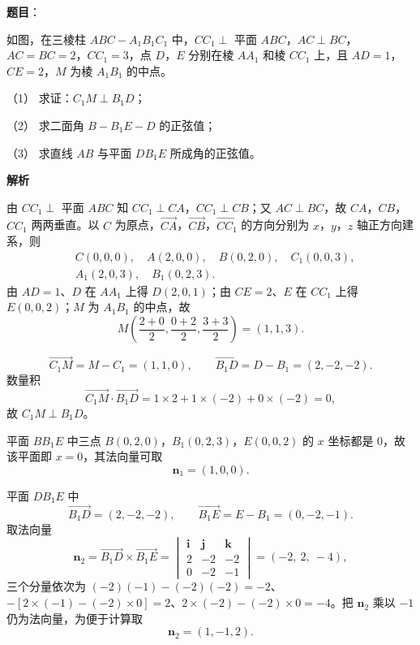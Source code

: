 \begin{answer}

\textbf{题目}：

如图，在三棱柱 $ABC-A_1B_1C_1$ 中，$CC_1\perp$ 平面 $ABC$，$AC\perp BC$，$AC=BC=2$，$CC_1=3$，点 $D$，$E$ 分别在棱 $AA_1$ 和棱 $CC_1$ 上，且 $AD=1$，$CE=2$，$M$ 为棱 $A_1B_1$ 的中点。

（1） 求证：$C_1M\perp B_1D$；

（2） 求二面角 $B-B_1E-D$ 的正弦值；

（3） 求直线 $AB$ 与平面 $DB_1E$ 所成角的正弦值。
\nopagebreak[4]
\begin{center}\end{center}
\nopagebreak[4]
\textbf{解析}

由 $CC_1\perp$ 平面 $ABC$ 知 $CC_1\perp CA$，$CC_1\perp CB$；又 $AC\perp BC$，故 $CA$，$CB$，$CC_1$ 两两垂直。以 $C$ 为原点，$\overrightarrow{CA}$，$\overrightarrow{CB}$，$\overrightarrow{CC_1}$ 的方向分别为 $x$，$y$，$z$ 轴正方向建系，则
\nopagebreak[4]
\[\begin{aligned}
&C(0,0,0),\quad A(2,0,0),\quad B(0,2,0),\quad C_1(0,0,3),\\
&A_1(2,0,3),\quad B_1(0,2,3).
\end{aligned}\]
由 $AD=1$、$D$ 在 $AA_1$ 上得 $D(2,0,1)$；由 $CE=2$、$E$ 在 $CC_1$ 上得 $E(0,0,2)$；$M$ 为 $A_1B_1$ 的中点，故
\nopagebreak[4]
\[M\left(\frac{2+0}2,\frac{0+2}2,\frac{3+3}2\right)=(1,1,3).\]


\nopagebreak[4]
\[\overrightarrow{C_1M}=M-C_1=(1,1,0),\qquad \overrightarrow{B_1D}=D-B_1=(2,-2,-2).\]
数量积
\nopagebreak[4]
\[\overrightarrow{C_1M}\cdot\overrightarrow{B_1D}=1\times2+1\times(-2)+0\times(-2)=0,\]
故 $C_1M\perp B_1D$。


平面 $BB_1E$ 中三点 $B(0,2,0)$，$B_1(0,2,3)$，$E(0,0,2)$ 的 $x$ 坐标都是 $0$，故该平面即 $x=0$，其法向量可取
\nopagebreak[4]
\[\boldsymbol n_1=(1,0,0).\]

平面 $DB_1E$ 中
\nopagebreak[4]
\[\overrightarrow{B_1D}=(2,-2,-2),\qquad \overrightarrow{B_1E}=E-B_1=(0,-2,-1).\]
取法向量
\nopagebreak[4]
\[\boldsymbol n_2=\overrightarrow{B_1D}\times\overrightarrow{B_1E}=
\begin{vmatrix}
\boldsymbol i&\boldsymbol j&\boldsymbol k\\
2&-2&-2\\
0&-2&-1
\end{vmatrix}
=(-2,\ 2,\ -4),\]
三个分量依次为 $(-2)(-1)-(-2)(-2)=-2$、$-[2\times(-1)-(-2)\times0]=2$、$2\times(-2)-(-2)\times0=-4$。把 $\boldsymbol n_2$ 乘以 $-1$ 仍为法向量，为便于计算取
\nopagebreak[4]
\[\boldsymbol n_2=(1,-1,2).\]


\end{answer}
